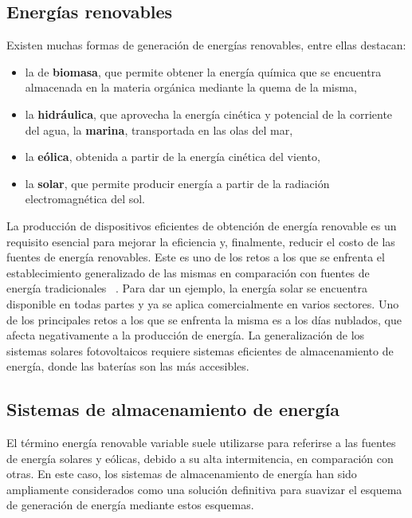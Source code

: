 \subsection{Energías renovables}

Existen muchas formas de generación de energías renovables, entre ellas destacan:
\begin{itemize}
    \item la de \textbf{biomasa}, que permite obtener la energía química 
        que se encuentra almacenada en la materia orgánica mediante la quema de 
        la misma,
    \item la \textbf{hidráulica}, que aprovecha la energía cinética y potencial
        de la corriente del agua, la \textbf{marina}, transportada en las olas
        del mar,
    \item la \textbf{eólica}, obtenida a partir de la energía cinética del viento,
    \item la \textbf{solar}, que permite producir energía a partir de la radiación
        electromagnética del sol.
\end{itemize}
La producción de dispositivos eficientes de obtención de energía renovable es un 
requisito esencial para mejorar la eficiencia y, finalmente, reducir el costo de 
las fuentes de energía renovables. Este es uno de los retos a los que se 
enfrenta el establecimiento generalizado de las mismas en comparación con fuentes
de energía tradicionales ~\cite{olabi2022}. Para dar un ejemplo, la energía solar 
se encuentra disponible en todas partes y ya se aplica comercialmente en varios 
sectores. Uno de los principales retos a los que se enfrenta la misma es a los 
días nublados, que afecta negativamente a la producción de energía. La 
generalización de los sistemas solares fotovoltaicos requiere sistemas eficientes 
de almacenamiento de energía, donde las baterías son las más accesibles. 

\subsection{Sistemas de almacenamiento de energía}

El término energía renovable variable suele utilizarse para referirse a las 
fuentes de energía solares y eólicas, debido a su alta intermitencia, en 
comparación con otras. En este caso, los sistemas de almacenamiento de energía 
han sido ampliamente considerados como una solución definitiva para suavizar el 
esquema de generación de energía mediante estos esquemas.

